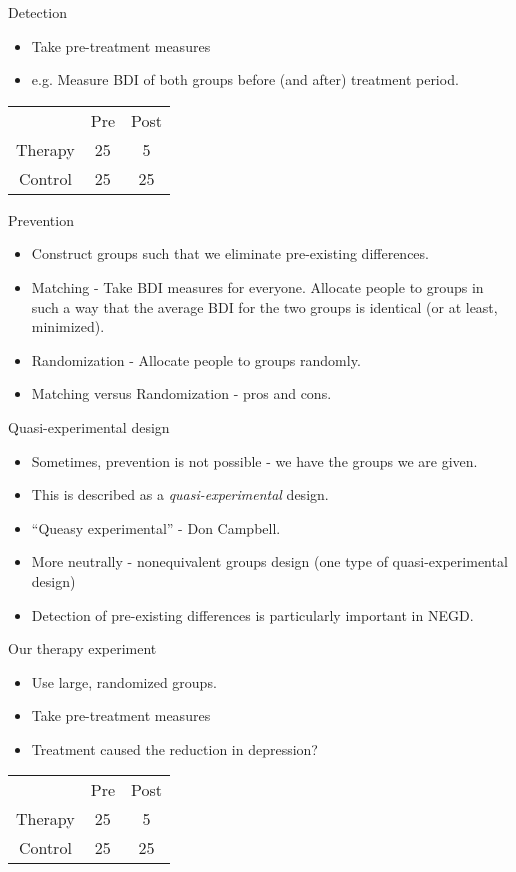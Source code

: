 \documentclass{beamer}
\begin{document}
\begin{frame}{Detection}
\begin{itemize}
\item Take pre-treatment measures
\item e.g. Measure BDI of both groups before (and after) treatment period.
\end{itemize}
\begin{tabular} {c c c}
			&	Pre	 &	Post \\
Therapy	&	25	&		5 \\
Control	&	25	&		25 \\
\end{tabular} 
\end{frame}



\begin{frame}{Prevention}
\begin{itemize}
\item Construct groups such that we eliminate pre-existing differences.
\item Matching - Take BDI measures for everyone. Allocate people to groups in such a way that the average BDI for the two groups is identical (or at least, minimized).
\item Randomization - Allocate people to groups randomly.
\item Matching versus Randomization - pros and cons.
\end{itemize}
\end{frame}



\begin{frame}{Quasi-experimental design}
\begin{itemize}
\item Sometimes, prevention is not possible - we have the groups we are given.
\item This is described as a \emph{quasi-experimental} design.
\item ``Queasy experimental'' - Don Campbell.
\item More neutrally - nonequivalent groups design (one type of quasi-experimental design)
\item Detection of pre-existing differences is particularly important in NEGD.
\end{itemize}
\end{frame}


\begin{frame}{Our therapy experiment}
\begin{itemize}
\item Use large, randomized groups.
\item Take pre-treatment measures
\item Treatment caused the reduction in depression?
\end{itemize}
\vspace{12 pt}
\begin{tabular} {c c c}
			&	Pre	 &	Post \\
Therapy	&	25	&		5 \\
Control	&	25	&		25 \\
\end{tabular} 
\end{frame}
\end{document}
